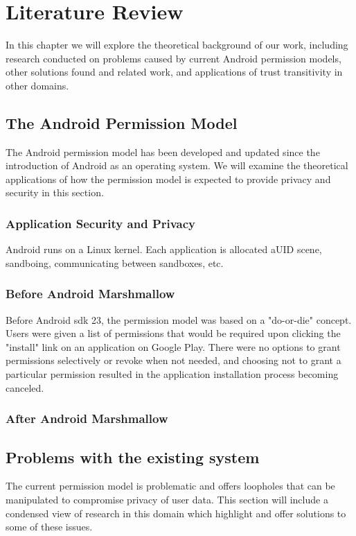 \chapter{Literature Review} \label{cha:litrev}
In this chapter we will explore the theoretical background of our work, including research conducted on problems caused by current Android permission models, other solutions found and related work, and applications of trust transitivity in other domains.

\section{The Android Permission Model}
The Android permission model has been developed and updated since the introduction of Android as an operating system. We will examine the theoretical applications of how the permission model is expected to provide privacy and security in this section. 
\subsection{Application Security and Privacy}
Android runs on a Linux kernel. Each application is allocated aUID scene, sandboing, communicating between sandboxes, etc. 

\subsection{Before Android Marshmallow}
Before Android sdk 23, the permission model was based on a "do-or-die" concept. Users were given a list of permissions that would be required upon clicking the "install" link on an application on Google Play. There were no options to grant permissions selectively or revoke when not needed, and choosing not to grant a particular permission resulted in the application installation process becoming canceled\cite{felt2011effectiveness}.
 
\subsection{After Android Marshmallow}

\section{Problems with the existing system}
The current permission model is problematic and offers loopholes that can be manipulated to compromise privacy of user data. This section will include a condensed view of research in this domain which highlight and offer solutions to some of these issues. 

